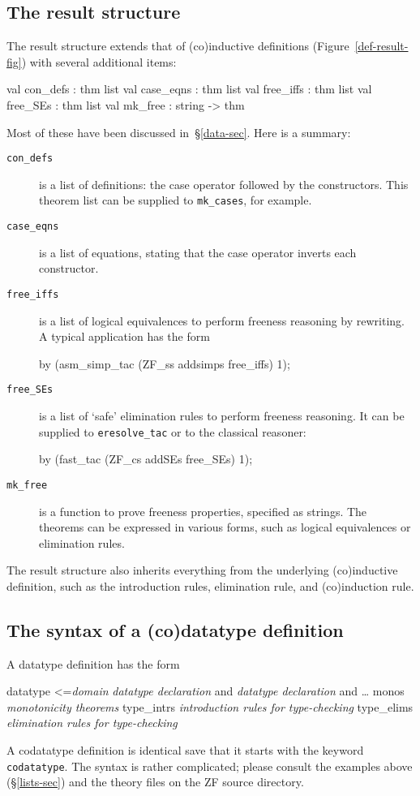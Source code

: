\subsection{The result structure}
The result structure extends that of (co)inductive definitions
(Figure~\ref{def-result-fig}) with several additional items:
\begin{ttbox}
val con_defs  : thm list
val case_eqns : thm list
val free_iffs : thm list
val free_SEs  : thm list
val mk_free   : string -> thm
\end{ttbox}
Most of these have been discussed in~\S\ref{data-sec}.  Here is a summary:
\begin{description}
\item[\tt con\_defs] is a list of definitions: the case operator followed by
the constructors.  This theorem list can be supplied to \verb|mk_cases|, for
example.

\item[\tt case\_eqns] is a list of equations, stating that the case operator
inverts each constructor.

\item[\tt free\_iffs] is a list of logical equivalences to perform freeness
reasoning by rewriting.  A typical application has the form
\begin{ttbox}
by (asm_simp_tac (ZF_ss addsimps free_iffs) 1);
\end{ttbox}

\item[\tt free\_SEs] is a list of `safe' elimination rules to perform freeness
reasoning.  It can be supplied to \verb|eresolve_tac| or to the classical
reasoner:
\begin{ttbox} 
by (fast_tac (ZF_cs addSEs free_SEs) 1);
\end{ttbox}

\item[\tt mk\_free] is a function to prove freeness properties, specified as
strings.  The theorems can be expressed in various forms, such as logical
equivalences or elimination rules.
\end{description}

The result structure also inherits everything from the underlying
(co)inductive definition, such as the introduction rules, elimination rule,
and (co)induction rule.


\subsection{The syntax of a (co)datatype definition}
A datatype definition has the form
\begin{ttbox}
datatype <={\it domain}
 {\it datatype declaration} and {\it datatype declaration} and \ldots
  monos      {\it monotonicity theorems}
  type_intrs {\it introduction rules for type-checking}
  type_elims {\it elimination rules for type-checking}
\end{ttbox}
A codatatype definition is identical save that it starts with the keyword
{\tt codatatype}.  The syntax is rather complicated; please consult the
examples above (\S\ref{lists-sec}) and the theory files on the ZF source
directory.

